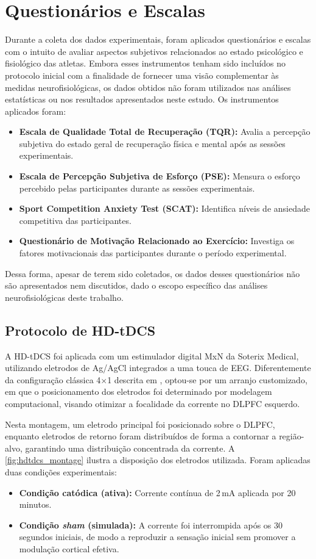 \section{Questionários e Escalas}
Durante a coleta dos dados experimentais, foram aplicados questionários e escalas com o intuito de avaliar aspectos subjetivos relacionados ao estado psicológico e fisiológico das atletas. Embora esses instrumentos tenham sido incluídos no protocolo inicial com a finalidade de fornecer uma visão complementar às medidas neurofisiológicas, os dados obtidos não foram utilizados nas análises estatísticas ou nos resultados apresentados neste estudo. Os instrumentos aplicados foram:

\begin{itemize}
    \item \textbf{Escala de Qualidade Total de Recuperação (TQR):} Avalia a percepção subjetiva do estado geral de recuperação física e mental após as sessões experimentais.
    \item \textbf{Escala de Percepção Subjetiva de Esforço (PSE):} Mensura o esforço percebido pelas participantes durante as sessões experimentais.
    \item \textbf{Sport Competition Anxiety Test (SCAT):} Identifica níveis de ansiedade competitiva das participantes.
    \item \textbf{Questionário de Motivação Relacionado ao Exercício:} Investiga os fatores motivacionais das participantes durante o período experimental.
\end{itemize}

Dessa forma, apesar de terem sido coletados, os dados desses questionários não são apresentados nem discutidos, dado o escopo específico das análises neurofisiológicas deste trabalho.

\subsection{Protocolo de HD-tDCS}
\label{subsec:hdtdcs_protocol}
A HD-tDCS foi aplicada com um estimulador digital MxN da Soterix Medical, utilizando eletrodos de Ag/AgCl integrados a uma touca de EEG. Diferentemente da configuração clássica 4$\times$1 descrita em , optou-se por um arranjo customizado, em que o posicionamento dos eletrodos foi determinado por modelagem computacional, visando otimizar a focalidade da corrente no DLPFC esquerdo.

Nesta montagem, um eletrodo principal foi posicionado sobre o DLPFC, enquanto eletrodos de retorno foram distribuídos de forma a contornar a região-alvo, garantindo uma distribuição concentrada da corrente. A \ref{fig:hdtdcs_montage} ilustra a disposição dos eletrodos utilizada. Foram aplicadas duas condições experimentais:
\begin{itemize}
    \item \textbf{Condição catódica (ativa):} Corrente contínua de 2\,mA aplicada por 20 minutos.
    \item \textbf{Condição \textit{sham} (simulada):} A corrente foi interrompida após os 30\,segundos iniciais, de modo a reproduzir a sensação inicial sem promover a modulação cortical efetiva.
\end{itemize}


